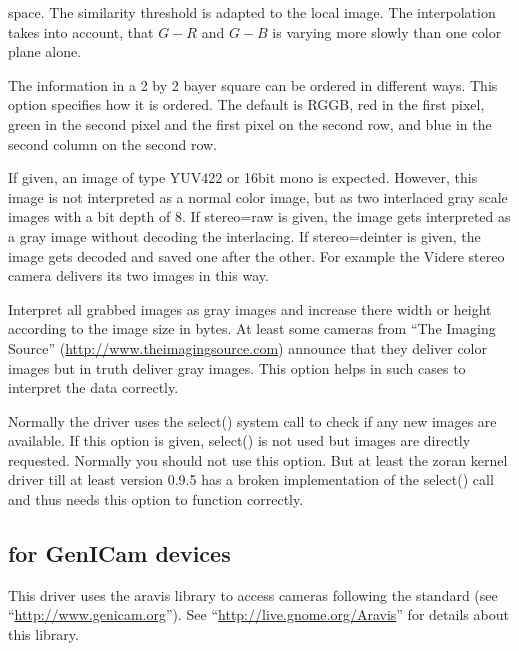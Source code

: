 \begin{description}
\begin{description}
    space. The similarity threshold is adapted to the local
    image. The interpolation takes into account, that $G-R$ and
    $G-B$ is varying more slowly than one color plane alone.
  \end{description}
\item[pattern=RGGB\textbar{}BGGR\textbar{}GRBG\textbar{}GBRG] The
  information in a 2 by 2 bayer square can be ordered in different
  ways. This option specifies how it is ordered. The default is
  RGGB, red in the first pixel, green in the second pixel and the
  first pixel on the second row, and blue in the second column on
  the second row.
\item[stereo=raw\textbar{}deinter] If given, an
  image of type YUV422 or 16bit mono is expected. However, this
  image is not interpreted as a normal color image, but as two
  interlaced gray scale images with a bit depth of 8. If stereo=raw
  is given, the image gets interpreted as a gray image without
  decoding the interlacing. If stereo=deinter is given, the image
  gets decoded and saved one after the other. For example the Videre
  stereo camera delivers its two images in this way.
\item[gray=w\textbar{}h] Interpret all grabbed images as gray images
  and increase there width or height according to the image size in
  bytes. At least some cameras from ``The Imaging Source''
  (\url{http://www.theimagingsource.com}) announce that they deliver
  color images but in truth deliver gray images. This option helps
  in such cases to interpret the data correctly.
\item[noselect] Normally the driver uses the select() system call to
  check if any new images are available. If this option is given,
  select() is not used but images are directly requested. Normally
  you should not use this option. But at least the zoran kernel
  driver till at least version 0.9.5 has a broken implementation of
  the select() call and thus needs this option to function
  correctly.
\end{description}

\subsection { for GenICam devices}

This driver uses the aravis library to access cameras following the
 standard (see ``\url{http://www.genicam.org}''). See
``\url{http://live.gnome.org/Aravis}'' for details about this
library.

